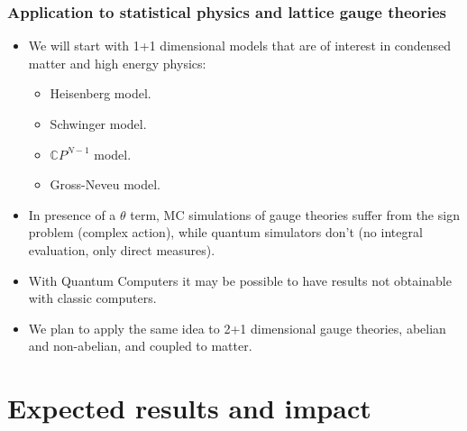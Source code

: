 \documentclass[10pt,t,xcolor=dvipsnames,aspectratio=169]{beamer}
\begin{document}
\begin{frame}
    \frametitle{Application to statistical physics and lattice gauge theories}
    \begin{itemize}
        \item
            We will start with 1+1 dimensional models that are of interest in condensed matter and high energy physics:
            \begin{itemize}
                \item Heisenberg model.
                \item Schwinger model.
                \item $\mathbb CP^{N-1}$ model.
                \item Gross-Neveu model.
            \end{itemize}
        \item
            In presence of a $\theta$ term, MC simulations of gauge theories suffer from the sign problem (complex action),
            while quantum simulators don't (no integral evaluation, only direct measures).
        \item
            With Quantum Computers it may be possible to have results not obtainable with classic computers.
        \item
            We plan to apply the same idea to 2+1 dimensional gauge theories, abelian and non-abelian, and coupled to matter.
    \end{itemize}
\end{frame}


\section{Expected results and impact}
\end{document}
